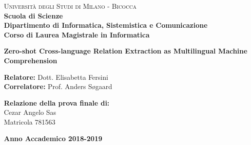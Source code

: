 \documentclass[a4paper,12pt, openright, oneside]{book}
\begin{document}
\begin{titlepage}
    \noindent
    \begin{minipage}[t]{0.19\textwidth}
    \end{minipage}
    \begin{minipage}[t]{0.81\textwidth}
    {
            {\textsc{Università degli Studi di Milano - Bicocca}} \\
            \textbf{Scuola di Scienze} \\
            \textbf{Dipartimento di Informatica, Sistemistica e Comunicazione} \\
            \textbf{Corso di Laurea Magistrale in Informatica} \\
            \par
    }
    \end{minipage}
    
\vspace{40mm}
    
\begin{center}
        {\LARGE{
                \textbf{Zero-shot Cross-language Relation Extraction as Multilingual Machine Comprehension}
                \par
        }}
    \end{center}
    
    \vspace{40mm}

    \noindent
    {\large \textbf{Relatore:} Dott. Elisabetta Fersini} \\

    \noindent
    {\large \textbf{Correlatore:} Prof. Anders S{\o}gaard}
        
    \vspace{15mm}

    \begin{flushright}
        {\large \textbf{Relazione della prova finale di:}} \\
        \large{Cezar Angelo Sas} \\
        \large{Matricola 781563} 
    \end{flushright}
        
    \vspace{40mm}
    \begin{center}
        {\large{\bf Anno Accademico 2018-2019}}
    \end{center}

    \restoregeometry
        
\end{titlepage}
\end{document}
